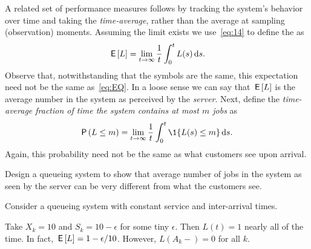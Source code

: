 A related set of performance measures follows by tracking the system's behavior over time and taking the \emph{time-average}, rather than the average at sampling (observation) moments.
Assuming the limit exists we use~\eqref{eq:14} to define the  as
\begin{equation}
  \label{eq:46}
  \,\mathsf{E}\left[L\right] = \lim_{t\to\infty} \frac 1 t\int_0^t L(s) \,\text{d}s.
\end{equation}
Observe that, notwithstanding that the symbols are the same, this expectation need not be the same as~\eqref{eq:EQ}.
In a loose sense we can say that $\,\mathsf{E}\left[L\right]$ is the average number in the system as perceived by the \emph{server}.
Next, define the \emph{time-average fraction of time the system contains at most $m$ jobs} as
\begin{equation}
  \label{eq:47}
  \P{L\leq m} =\lim_{t\to\infty} \frac 1 t\int_0^t \1{L(s)\leq m} \d s.
\end{equation}
Again, this probability need not be the same as what customers see upon arrival.


\begin{exercise}
Design a queueing system to show that average number of jobs in the system as seen by the server can be very different from what the customers see.
  \begin{hint}
Consider a queueing system with constant service and inter-arrival times.
  \end{hint}
\begin{solution}
  Take $X_k = 10$ and $S_k = 10-\epsilon$ for some tiny
  $\epsilon$. Then $L(t) = 1$ nearly all of the time. In fact,
  $\,\mathsf{E}\left[L\right] = 1-\epsilon/10$. However, $L(A_k-)=0$ for all $k$.
\end{solution}
\end{exercise}



